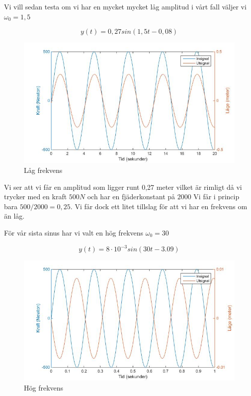 \documentclass[10pt,a4paper]{article}
\begin{document}
Vi vill sedan testa om vi har en mycket mycket låg amplitud i vårt fall väljer vi $\omega_0 = 1,5$

\begin{equation}
y(t) = 0,27 sin(1,5 t - 0,08)
\end{equation}

\begin{figure}[h]
\begin{center}
\includegraphics[scale=0.4]{sinussvar2}
\caption{Låg frekvens}
\end{center}
\end{figure}

\newpage
Vi ser att vi får en amplitud som ligger runt 0,27 meter vilket är rimligt då vi trycker med en kraft $500N$ och har en fjäderkonstant på $2000$ Vi får i princip bara $500/2000 = 0,25$. Vi får dock ett litet tillslag för att vi har en frekvens om än låg.

För vår sista sinus har vi valt en hög frekvens $\omega_0 = 30$

\begin{equation}
y(t) = 8\cdot 10^{-3} sin(30 t - 3.09)
\end{equation}

\begin{figure}[h]
\begin{center}
\includegraphics[scale=0.4]{sinussvar3}
\caption{Hög frekvens}
\end{center}
\end{figure}
\end{document}
